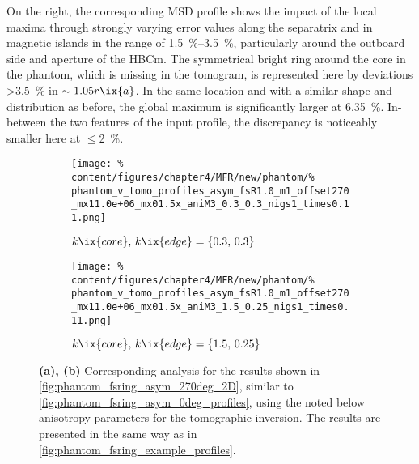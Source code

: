                 On the right, the corresponding MSD profile shows the impact of the local maxima through strongly varying error values along the separatrix and in magnetic islands in the range of \SIrange{1.5}{3.5}{\percent}, particularly around the outboard side and aperture of the HBCm. The symmetrical bright ring around the core in the phantom, which is missing in the tomogram, is represented here by deviations >\SI{3.5}{\percent} in $\sim1.05r\ix{a}$. In the same location and with a similar shape and distribution as before, the global maximum is significantly larger at \SI{6.35}{\percent}. In-between the two features of the input profile, the discrepancy is noticeably smaller here at $\le$\SI{2}{\percent}.\\%
%
                \begin{figure}[t]%
                    \centering%
                    \begin{subfigure}{\textwidth}%
                        \centering%
                        \texttt{[image: \%
                            content/figures/chapter4/MFR/new/phantom/\%
                            phantom\_v\_tomo\_profiles\_asym\_fsR1.0\_m1\_offset270\_mx11.0e+06\_mx01.5x\_aniM3\_0.3\_0.3\_nigs1\_times0.11.png]}%
                        \caption{$k\ix{core},\,k\ix{edge}=\left\{0.3,\,0.3\right\}$}%
                    \end{subfigure}%
                    \newline%
                    \begin{subfigure}{\textwidth}%
                        \centering%
                        \texttt{[image: \%
                            content/figures/chapter4/MFR/new/phantom/\%
                            phantom\_v\_tomo\_profiles\_asym\_fsR1.0\_m1\_offset270\_mx11.0e+06\_mx01.5x\_aniM3\_1.5\_0.25\_nigs1\_times0.11.png]}%
                        \caption{$k\ix{core},\,k\ix{edge}=\left\{1.5,\,0.25\right\}$}%
                    \end{subfigure}%
                    \caption{\textbf{(a), (b)} Corresponding analysis for the results shown in \cref{fig:phantom_fsring_asym_270deg_2D}, similar to \cref{fig:phantom_fsring_asym_0deg_profiles}, using the noted below anisotropy parameters for the tomographic inversion. The results are presented in the same way as in \cref{fig:phantom_fsring_example_profiles}.}\label{fig:phantom_fsring_asym_270deg_profiles}%
                \end{figure}%
%
